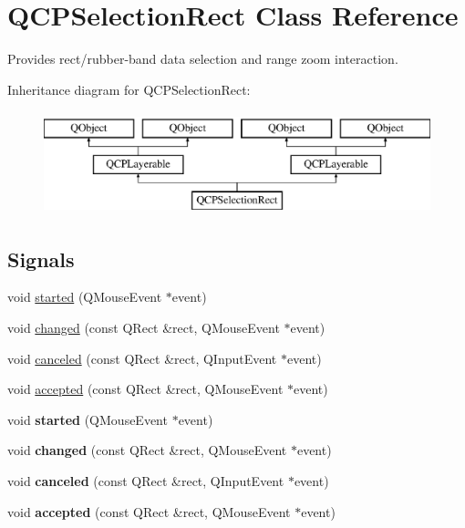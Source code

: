 \hypertarget{class_q_c_p_selection_rect}{}\section{Q\+C\+P\+Selection\+Rect Class Reference}
\label{class_q_c_p_selection_rect}


Provides rect/rubber-\/band data selection and range zoom interaction.  


Inheritance diagram for Q\+C\+P\+Selection\+Rect\+:\begin{figure}[H]
\begin{center}
\leavevmode
\includegraphics[height=3.000000cm]{class_q_c_p_selection_rect}
\end{center}
\end{figure}
\subsection*{Signals}
\begin{DoxyCompactItemize}
\item 
void \hyperlink{class_q_c_p_selection_rect_a7b7162d19f4f2174d3644ff1a5d335aa}{started} (Q\+Mouse\+Event $\ast$event)
\item 
void \hyperlink{class_q_c_p_selection_rect_a1bab11026bca52740c2e6682623e6964}{changed} (const Q\+Rect \&rect, Q\+Mouse\+Event $\ast$event)
\item 
void \hyperlink{class_q_c_p_selection_rect_aeb82009393c90130102dccf36477b906}{canceled} (const Q\+Rect \&rect, Q\+Input\+Event $\ast$event)
\item 
void \hyperlink{class_q_c_p_selection_rect_a15a43542e1f7b953a44c260b419e6d2c}{accepted} (const Q\+Rect \&rect, Q\+Mouse\+Event $\ast$event)
\item 
\mbox{\label{class_q_c_p_selection_rect_a7b7162d19f4f2174d3644ff1a5d335aa}} 
void {\bfseries started} (Q\+Mouse\+Event $\ast$event)
\item 
\mbox{\label{class_q_c_p_selection_rect_a1bab11026bca52740c2e6682623e6964}} 
void {\bfseries changed} (const Q\+Rect \&rect, Q\+Mouse\+Event $\ast$event)
\item 
\mbox{\label{class_q_c_p_selection_rect_aeb82009393c90130102dccf36477b906}} 
void {\bfseries canceled} (const Q\+Rect \&rect, Q\+Input\+Event $\ast$event)
\item 
\mbox{\label{class_q_c_p_selection_rect_a15a43542e1f7b953a44c260b419e6d2c}} 
void {\bfseries accepted} (const Q\+Rect \&rect, Q\+Mouse\+Event $\ast$event)
\end{DoxyCompactItemize}
